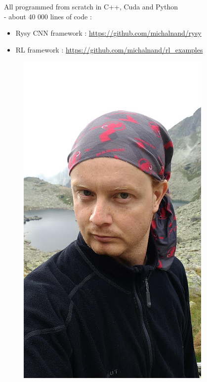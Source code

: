 \documentclass[xcolor=dvipsnames]{beamer}
\begin{document}
\begin{frame}
All programmed from scratch in C++, Cuda and Python \\ - about 40 000 lines of code :
\begin{itemize}
    \item Rysy CNN framework : \url{https://github.com/michalnand/rysy}
    \item RL framework :  \url{https://github.com/michalnand/rl_examples}
\end{itemize}

\begin{figure}
  \includegraphics[scale=0.15]{../../pictures/me.jpg}
\end{figure}




\end{frame}
\end{document}
